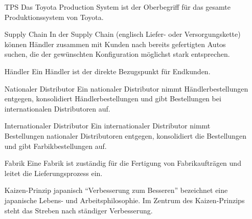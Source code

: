 \documentclass[a4paper,10pt,left=1.5cm,right=1.5cm,top=1.5cm,bottom=1.5cm]{article}
\begin{document}
\begin{itemize}
  \item[TPS] Das Toyota Production System ist der Oberbegriff für das gesamte Produktionssystem von Toyota.
  \item[Supply Chain] In der Supply Chain (englisch Liefer- oder Versorgungskette) können Händler zusammen mit Kunden nach bereits gefertigten Autos suchen, die der gewünschten Konfiguration möglichst stark entsprechen.
  \item[Händler] Ein Händler ist der direkte Bezugspunkt für Endkunden.
  \item[Nationaler Distributor] Ein nationaler Distributor nimmt Händlerbestellungen entgegen, konsolidiert Händlerbestellungen und gibt Bestellungen bei internationalen Distributoren auf.
  \item[Internationaler Distributor] Ein internationaler Distributor nimmt Bestellungen nationaler Distributoren entgegen, konsolidiert die Bestellungen und gibt Farbikbestellungen auf.
  \item[Fabrik] Eine Fabrik ist zuständig für die Fertigung von Fabrikaufträgen und leitet die Lieferungsprozess ein.
  \item[Kaizen-Prinzip] japanisch "`Verbesserung zum Besseren"' bezeichnet eine japanische Lebens- und Arbeitsphilosophie. Im Zentrum des Kaizen-Prinzips steht das Streben nach ständiger Verbesserung.
\end{itemize}
\end{document}
